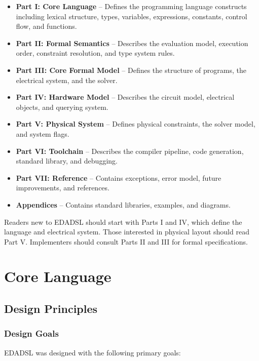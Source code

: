 \documentclass{report}
\begin{document}
\begin{itemize}
\item \textbf{Part I: Core Language} -- Defines the programming language constructs including lexical structure, types, variables, expressions, constants, control flow, and functions.
\item \textbf{Part II: Formal Semantics} -- Describes the evaluation model, execution order, constraint resolution, and type system rules.
\item \textbf{Part III: Core Formal Model} -- Defines the structure of programs, the electrical system, and the solver.
\item \textbf{Part IV: Hardware Model} -- Describes the circuit model, electrical objects, and querying system.
\item \textbf{Part V: Physical System} -- Defines physical constraints, the solver model, and system flags.
\item \textbf{Part VI: Toolchain} -- Describes the compiler pipeline, code generation, standard library, and debugging.
\item \textbf{Part VII: Reference} -- Contains exceptions, error model, future improvements, and references.
\item \textbf{Appendices} -- Contains standard libraries, examples, and diagrams.
\end{itemize}

Readers new to EDADSL should start with Parts I and IV, which define the language and electrical system. Those interested in physical layout should read Part V. Implementers should consult Parts II and III for formal specifications.


\part{Core Language}
\chapter{Design Principles}
\section{Design Goals}
EDADSL was designed with the following primary goals:
\end{document}
